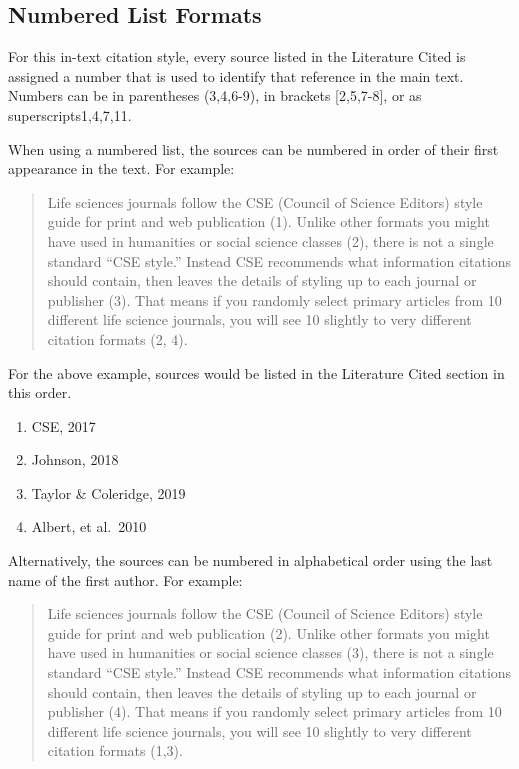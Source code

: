 \documentclass[
]{book}
\providecommand{\tightlist}{%
  \setlength{\itemsep}{0pt}\setlength{\parskip}{0pt}}
\begin{document}
\hypertarget{numbered-list-formats}{%
\subsection{Numbered List Formats}\label{numbered-list-formats}}

For this in-text citation style, every source listed in the Literature Cited is assigned a number that is used to identify that reference in the main text. Numbers can be in parentheses (3,4,6-9), in brackets {[}2,5,7-8{]}, or as superscripts1,4,7,11.

When using a numbered list, the sources can be numbered in order of their first appearance in the text. For example:

\begin{quote}
Life sciences journals follow the CSE (Council of Science Editors) style guide for print and web publication (1). Unlike other formats you might have used in humanities or social science classes (2), there is not a single standard ``CSE style.'' Instead CSE recommends what information citations should contain, then leaves the details of styling up to each journal or publisher (3). That means if you randomly select primary articles from 10 different life science journals, you will see 10 slightly to very different citation formats (2, 4).
\end{quote}

For the above example, sources would be listed in the Literature Cited section in this order.

\begin{enumerate}
\def\labelenumi{\arabic{enumi}.}
\tightlist
\item
  CSE, 2017
\item
  Johnson, 2018
\item
  Taylor \& Coleridge, 2019
\item
  Albert, et al.~2010
\end{enumerate}

Alternatively, the sources can be numbered in alphabetical order using the last name of the first author. For example:

\begin{quote}
Life sciences journals follow the CSE (Council of Science Editors) style guide for print and web publication (2). Unlike other formats you might have used in humanities or social science classes (3), there is not a single standard ``CSE style.'' Instead CSE recommends what information citations should contain, then leaves the details of styling up to each journal or publisher (4). That means if you randomly select primary articles from 10 different life science journals, you will see 10 slightly to very different citation formats (1,3).
\end{quote}
\end{document}
